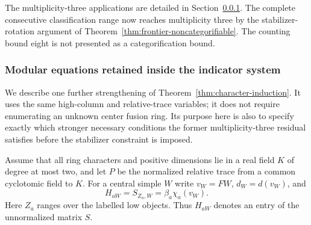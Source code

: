 


The multiplicity-three applications are detailed in
Section~\ref{sec:modular-frontier}. The complete consecutive classification
range now reaches multiplicity three by the stabilizer-rotation argument
of Theorem~\ref{thm:frontier-noncategorifiable}. The counting bound eight is
not presented as a categorification bound.

\subsubsection{Modular equations retained inside the indicator system}
\label{sec:modular-frontier}
We describe one further strengthening of
Theorem~\ref{thm:character-induction}. It uses the same high-column and
relative-trace variables; it does not require enumerating an unknown
center fusion ring. Its purpose here is also to specify exactly which
stronger necessary conditions the former multiplicity-three residual
satisfies before the stabilizer constraint is imposed.

Assume that all ring characters and positive dimensions lie in a real
field $K$ of degree at most two, and let $P$ be the normalized relative
trace from a common cyclotomic field to $K$. For a central simple $W$
write $v_W=FW$, $d_W=d(v_W)$, and
\[
 H_{aW}=S_{Z_a,W}=\beta_a\chi_a(v_W).
\]
Here $Z_a$ ranges over the labelled low objects. Thus $H_{aW}$ denotes an entry of the unnormalized matrix $S$.

